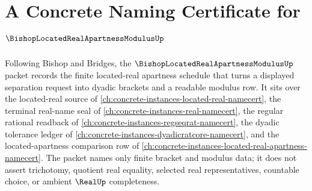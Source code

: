 \chapter{A Concrete Naming Certificate for $\BishopLocatedRealApartnessModulusUp$}
\label{ch:concrete-instances-bishop-located-real-apartness-modulus-namecert}

Following Bishop and Bridges, the $\BishopLocatedRealApartnessModulusUp$ packet records the finite located-real apartness schedule that turns a displayed separation request into dyadic brackets and a readable modulus row. It sits over the located-real source of \autoref{ch:concrete-instances-located-real-namecert}, the terminal real-name seal of \autoref{ch:concrete-instances-real-namecert}, the regular rational readback of \autoref{ch:concrete-instances-regseqrat-namecert}, the dyadic tolerance ledger of \autoref{ch:concrete-instances-dyadicratcore-namecert}, and the located-apartness comparison row of \autoref{ch:concrete-instances-located-real-apartness-namecert}. The packet names only finite bracket and modulus data; it does not assert trichotomy, quotient real equality, selected real representatives, countable choice, or ambient $\RealUp$ completeness.

